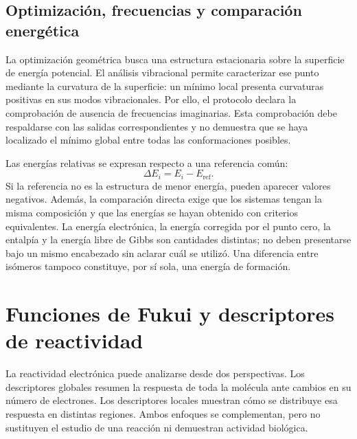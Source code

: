 \documentclass[12 pt, letter, oneside]{book}
\begin{document}
\section{Optimización, frecuencias y comparación energética}
La optimización geométrica busca una estructura estacionaria sobre la superficie de energía potencial. El análisis vibracional permite caracterizar ese punto mediante la curvatura de la superficie: un mínimo local presenta curvaturas positivas en sus modos vibracionales. Por ello, el protocolo declara la comprobación de ausencia de frecuencias imaginarias. Esta comprobación debe respaldarse con las salidas correspondientes y no demuestra que se haya localizado el mínimo global entre todas las conformaciones posibles.

Las energías relativas se expresan respecto a una referencia común:
\begin{equation}
 \Delta E_i=E_i-E_{\mathrm{ref}}.
\end{equation}
Si la referencia no es la estructura de menor energía, pueden aparecer valores negativos. Además, la comparación directa exige que los sistemas tengan la misma composición y que las energías se hayan obtenido con criterios equivalentes. La energía electrónica, la energía corregida por el punto cero, la entalpía y la energía libre de Gibbs son cantidades distintas; no deben presentarse bajo un mismo encabezado sin aclarar cuál se utilizó. Una diferencia entre isómeros tampoco constituye, por sí sola, una energía de formación.

\chapter{Funciones de Fukui y descriptores de reactividad}
\label{ap:reactividad}

La reactividad electrónica puede analizarse desde dos perspectivas. Los descriptores globales resumen la respuesta de toda la molécula ante cambios en su número de electrones. Los descriptores locales muestran cómo se distribuye esa respuesta en distintas regiones. Ambos enfoques se complementan, pero no sustituyen el estudio de una reacción ni demuestran actividad biológica.
\end{document}
